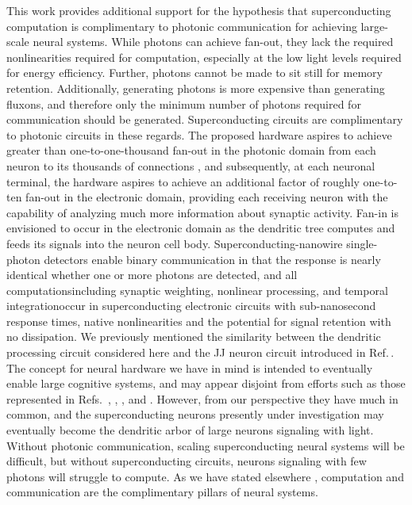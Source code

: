 \documentclass[twocolumn]{article}
\newcommand{\onlinecite}[1]{\hspace{-1 ex} \nocite{#1}\citenum{#1}}
\begin{document}
This work provides additional support for the hypothesis that superconducting computation is complimentary to photonic communication for achieving large-scale neural systems. While photons can achieve fan-out, they lack the required nonlinearities required for computation, especially at the low light levels required for energy efficiency. Further, photons cannot be made to sit still for memory retention. Additionally, generating photons is more expensive than generating fluxons, and therefore only the minimum number of photons required for communication should be generated. Superconducting circuits are complimentary to photonic circuits in these regards. The proposed hardware aspires to achieve greater than one-to-one-thousand fan-out in the photonic domain from each neuron to its thousands of connections \cite{sh2018_ICRC}, and subsequently, at each neuronal terminal, the hardware aspires to achieve an additional factor of roughly one-to-ten fan-out in the electronic domain, providing each receiving neuron with the capability of analyzing much more information about synaptic activity. Fan-in is envisioned to occur in the electronic domain as the dendritic tree computes and feeds its signals into the neuron cell body. Superconducting-nanowire single-photon detectors enable binary communication in that the response is nearly identical whether one or more photons are detected, and all computations\textemdash including synaptic weighting, nonlinear processing, and temporal integration\textemdash occur in superconducting electronic circuits with sub-nanosecond response times, native nonlinearities and the potential for signal retention with no dissipation. We previously mentioned the similarity between the dendritic processing circuit considered here and the JJ neuron circuit introduced in Ref.\,\cite{crsc2010}. The concept for neural hardware we have in mind is intended to eventually enable large cognitive systems, and may appear disjoint from efforts such as those represented in Refs.\,\onlinecite{crsc2010}, \onlinecite{segu2014}, \onlinecite{sele2017}, and \onlinecite{scdo2018}. However, from our perspective they have much in common, and the superconducting neurons presently under investigation may eventually become the dendritic arbor of large neurons signaling with light. Without photonic communication, scaling superconducting neural systems will be difficult, but without superconducting circuits, neurons signaling with few photons will struggle to compute. As we have stated elsewhere \cite{sh2019_ne}, computation and communication are the complimentary pillars of neural systems.
 
\end{document}
